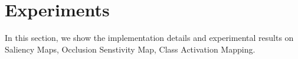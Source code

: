 \section{Experiments}


In this section, we show the implementation details and experimental results on Saliency Maps, Occlusion Senstivity Map, Class Activation Mapping.